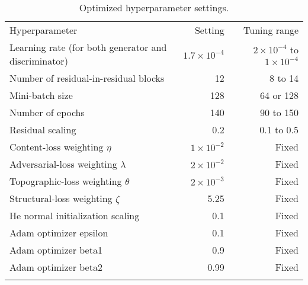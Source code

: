 \begin{appendices}
\begin{table}[b!]
  \caption{Optimized hyperparameter settings.}
  \label{table:B1}
  \begin{tabularx}{\textwidth}{lrr}
  \tophline
  Hyperparameter                                       & Setting             & Tuning range                           \\
  \middlehline
  Learning rate (for both generator and discriminator) & $1.7\times 10^{-4}$ & $2\times 10^{-4}$ to $1\times 10^{-4}$ \\
  Number of residual-in-residual blocks                & 12                  & 8 to 14                                \\
  Mini-batch size                                      & 128                 & 64 or 128                              \\
  Number of epochs                                     & 140                 & 90 to 150                              \\
  Residual scaling                                     & 0.2                 & 0.1 to 0.5                             \\
  Content-loss weighting $\eta$                        & $1\times 10^{-2}$   & Fixed                                  \\
  Adversarial-loss weighting $\lambda$                 & $2\times 10^{-2}$   & Fixed                                  \\
  Topographic-loss weighting $\theta$                  & $2\times 10^{-3}$   & Fixed                                  \\
  Structural-loss weighting $\zeta$                    & 5.25                & Fixed                                  \\
  He normal initialization scaling                     & 0.1                 & Fixed                                  \\
  Adam optimizer epsilon                               & 0.1                 & Fixed                                  \\
  Adam optimizer beta1                                 & 0.9                 & Fixed                                  \\
  Adam optimizer beta2                                 & 0.99                & Fixed                                  \\
  \bottomhline
  \end{tabularx}
\end{table}


\end{appendices}
